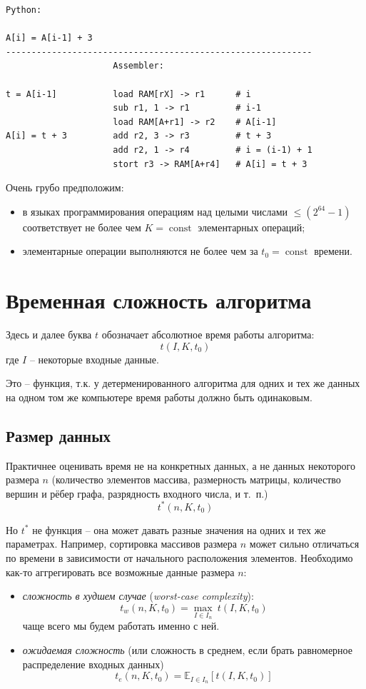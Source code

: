 \documentclass[12pt,a4paper]{report}
\def\const{\mathop{\mathrm{const}}\nolimits}
\begin{document}
\begin{verbatim}
Python:

A[i] = A[i-1] + 3
------------------------------------------------------------
                     Assembler:

t = A[i-1]           load RAM[rX] -> r1      # i
                     sub r1, 1 -> r1         # i-1
                     load RAM[A+r1] -> r2    # A[i-1]
A[i] = t + 3         add r2, 3 -> r3         # t + 3
                     add r2, 1 -> r4         # i = (i-1) + 1
                     stort r3 -> RAM[A+r4]   # A[i] = t + 3
\end{verbatim}

Очень грубо предположим:
\begin{itemize}
\item в языках программирования операциям над целыми числами $\leq (2^{64}-1)$ соответствует не более чем $K=\const$ элементарных операций;
\item элементарные операции выполняются не более чем за $t_0=\const$ времени.
\end{itemize}


\section{Временная сложность алгоритма}

Здесь и далее буква $t$ обозначает абсолютное время работы алгоритма:
$$
t(I, K, t_0)
$$
где $I$ -- некоторые входные данные.

Это -- функция, т.к. у детерменированного алгоритма для одних и тех же данных на одном том же компьютере время работы должно быть одинаковым.

\subsection*{Размер данных}

Практичнее оценивать время не на конкретных данных, а не данных некоторого размера $n$ (количество элементов массива, размерность матрицы, количество вершин и рёбер графа, разрядность входного числа, и т.~п.)
$$
t^*(n, K, t_0)
$$

Но $t^*$ не функция -- она может давать разные значения на одних и тех же параметрах. Например, сортировка массивов размера $n$ может сильно отличаться по времени в зависимости от начального расположения элементов. Необходимо как-то аггрегировать все возможные данные размера $n$: 

\begin{itemize}
\item {\em сложность в худшем случае} ({\em worst-case complexity}):
$$
\boxed{
  t_w(n, K, t_0) = \max_{I \in I_n}~{t(I, K, t_0)}  
}
$$
чаще всего мы будем работать именно с ней.
\item {\em ожидаемая сложность} (или сложность в среднем, если брать равномерное распределение входных данных)
$$
t_e(n, K, t_0) = \mathbb{E}_{I \in I_n} \left[ {t(I, K, t_0)} \right]
$$
\end{itemize}
\end{document}
